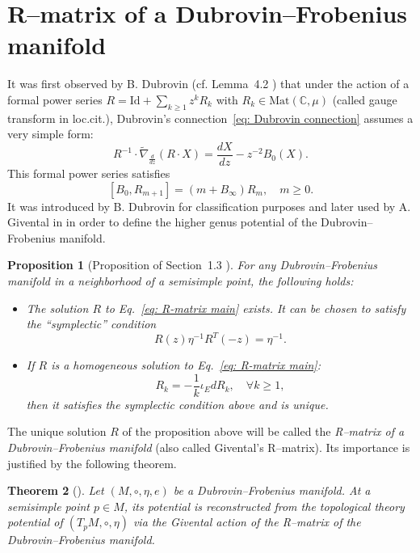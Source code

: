 \documentclass[12pt,a4paper]{amsart}
\newcommand{\CC}{{\mathbb{C}}}
\newcommand{\<}{\left<}
\renewcommand{\>}{\right>}
\newcommand{\Id}{\mathrm{Id}}
\newtheorem{theorem}{Theorem}[section]
\newtheorem{proposition}[theorem]{Proposition}
\numberwithin{equation}{section}
\begin{document}
\section{R--matrix of a Dubrovin--Frobenius manifold}
It was first observed by B. Dubrovin (cf. Lemma~4.2 \cite{D2}) that under the action of a formal power series $R = \Id + \sum_{k \ge 1} z^k R_k$ with $R_k \in \mathrm{Mat}(\CC,\mu)$ (called gauge transform in loc.cit.), Dubrovin's connection~\ref{eq: Dubrovin connection} assumes a very simple form:
\[
    R^{-1} \cdot \widetilde \nabla_{\frac{d}{dz}} (R \cdot X) = \frac{d X}{dz} - z^{-2} B_0(X).
\]
This formal power series satisfies
\begin{equation}\label{eq: R-matrix main}
 [B_0, R_{m+1}] = (m + B_\infty) R_m, \quad m \ge 0.
\end{equation}
It was introduced by B. Dubrovin for classification purposes and later used by A. Givental in \cite{G04} in order to define the higher genus potential of the Dubrovin--Frobenius manifold.

\begin{proposition}[Proposition of Section~1.3 \cite{G04}]\label{prop: Givental-main}
For any Dubrovin--Frobenius manifold in a neighborhood of a semisimple point, the following holds:
 \begin{itemize}
  \item The solution $R$ to Eq.~\eqref{eq: R-matrix main} exists. It can be chosen to satisfy the ``symplectic'' condition
    \[
    R(z)\eta^{-1} R^T(-z) = \eta^{-1}.
    \]
  \item If $R$ is a homogeneous solution to Eq.~\eqref{eq: R-matrix main}:
  \[
    R_k = - \frac{1}{k} \iota_E d R_k, \quad \forall k \ge 1,
  \]
  then it satisfies the symplectic condition above and is unique.
 \end{itemize}
\end{proposition}

The unique solution $R$ of the proposition above will be called the {\it R--matrix of a Dubrovin--Frobenius manifold} (also called Givental's R--matrix). Its importance is justified by the following theorem.

\begin{theorem}[\cite{G01b, G04}]
    Let $(M,\circ,\eta,e)$ be a Dubrovin--Frobenius manifold.
    At a semisimple point $p \in M$, its potential is reconstructed from the topological theory potential of $(T_pM,\circ,\eta)$ via the Givental action of the R--matrix of the Dubrovin--Frobenius manifold.
\end{theorem}
\end{document}
